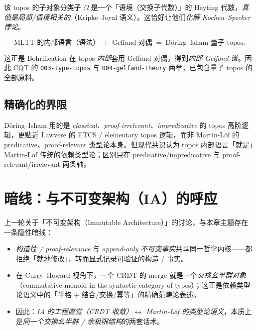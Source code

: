 \documentclass[10pt, openany]{book}
\begin{document}
该 topos 的子对象分类子 $\Omega$ 是一个「语境（交换子代数）」的 Heyting 代数，\emph{真值是局部/语境相关的}（Kripke--Joyal 语义）。这恰好让他们\emph{化解 Kochen--Specker 悖论}。

\begin{principle}
  \[
    \text{MLTT 的内部语言（语法）} \;+\; \text{Gelfand 对偶}
    \;=\; \text{D\"oring--Isham 量子 topos}.
  \]
\end{principle}

这正是 Bohrification 在 topos \emph{内部}套用 Gelfand 对偶，得到\emph{内部 Gelfand 谱}。因此 CQT 的 \texttt{003-type-topos} 与 \texttt{004-gelfand-theory} 两章，已包含量子 topos 的全部原料。

\section{精确化的界限}

D\"oring--Isham 用的是 \emph{classical、proof-irrelevant、impredicative} 的 topos 高阶逻辑，更贴近 Lawvere 的 ETCS / elementary topos 逻辑，而非 Martin-L\"of 的 predicative、proof-relevant 类型论本身。但现代共识认为 topos 内部语言「就是」Martin-L\"of 传统的依赖类型论；区别只在 predicative/impredicative 与 proof-relevant/irrelevant 两条轴。

\chapter{暗线：与不可变架构（IA）的呼应}

上一轮关于「不可变架构（Immutable Architecture）」的讨论，与本章主题存在一条隐性暗线：

\begin{itemize}
  \item \emph{构造性 / proof-relevance} 与 \emph{append-only 不可变事实}共享同一哲学内核——都拒绝「就地修改」，转而显式记录可验证的构造 / 事实。
  \item 在 Curry--Howard 视角下，一个 CRDT 的 $\mathrm{merge}$ 就是一个\emph{交换幺半群对象}（commutative monoid in the syntactic category of types）；这正是依赖类型论语义中的「半格 + 结合/交换/幂等」的精确范畴论表述。
  \item 因此：\emph{IA 的工程直觉（CRDT 收敛）$\leftrightarrow$ Martin-L\"of 的类型论语义}，本质上是\emph{同一个交换幺半群 / 余极限结构}的两套话术。
\end{itemize}

\appendix
\end{document}
